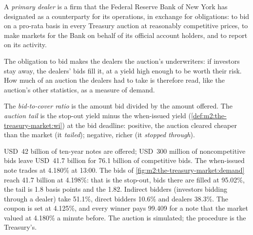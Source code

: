 \begin{definition}\label{def:m2:the-treasury-market:pd}
A \emph{primary dealer} is a firm that the Federal
Reserve Bank of New York has designated as a counterparty for its operations,
in exchange for obligations: to bid on a pro-rata basis in every Treasury
auction at reasonably competitive prices, to make markets for the Bank on
behalf of its official account holders, and to report on its activity.
\end{definition}

The obligation to bid makes the dealers the auction's underwriters: if
investors stay away, the dealers' bids fill it, at a yield high enough to be
worth their risk. How much of an auction the dealers had to take is therefore
read, like the auction's other statistics, as a measure of demand.

\begin{definition}\label{def:m2:the-treasury-market:tail}
The \emph{bid-to-cover ratio} is the amount bid
divided by the amount offered. The \emph{auction tail}
is the stop-out yield minus the when-issued yield
(\cref{def:m2:the-treasury-market:wi}) at the bid deadline: positive, the
auction cleared cheaper than the market (it \emph{tailed}); negative, richer
(it \emph{stopped through}).
\end{definition}

\begin{example}\label{ex:m2:the-treasury-market:auction}
USD~42 billion of ten-year notes are offered; USD~300 million of
noncompetitive bids leave USD~41.7 billion for 76.1 billion of competitive
bids. The when-issued note trades at 4.180\% at 13:00. The bids of
\cref{fig:m2:the-treasury-market:demand} reach 41.7 billion at 4.198\%: that is
the stop-out, bids there are filled at 95.02\%, the tail is 1.8 basis points
and the  1.82. Indirect bidders (investors bidding through a
dealer) take 51.1\%, direct bidders 10.6\% and dealers 38.3\%. The coupon is
set at 4.125\%, and every winner pays 99.409 for a note that the market valued
at 4.180\% a minute before. The auction is simulated; the procedure is the
Treasury's.
\end{example}

